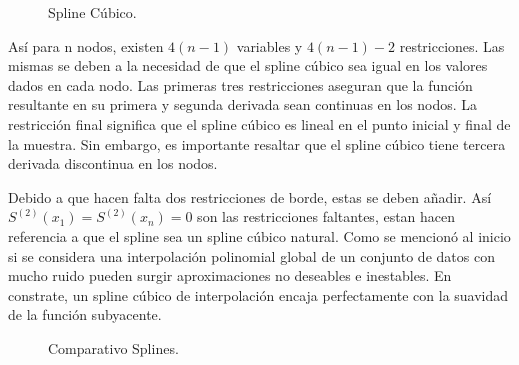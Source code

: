 \begin{figure}[h]
\caption{Spline C\'ubico.}
\label{spline_3}
\end{figure}


\hspace{0.4cm}As\'i para n nodos, existen $4(n-1)$ variables y $4(n-1)-2$ restricciones. Las mismas se deben a la necesidad de que el spline c\'ubico sea igual en los valores dados en cada nodo. Las primeras tres restricciones aseguran que la funci\'on resultante en su primera y segunda derivada sean continuas en los nodos. La restricci\'on final significa que el spline c\'ubico es lineal en el punto inicial y final de la muestra. Sin embargo, es importante resaltar que el spline c\'ubico tiene tercera derivada discontinua en los nodos.

\hspace{0.4cm}Debido a que hacen falta dos restricciones de borde, estas se deben a\~nadir. As\'i  $S^{(2)}(x_{1}) = S^{(2)}(x_{n}) = 0$ son las restricciones faltantes, estan hacen referencia a que el spline sea un spline c\'ubico natural. Como se mencion\'o al inicio si se considera una interpolaci\'on polinomial global de un conjunto de datos con mucho ruido pueden surgir aproximaciones no deseables e inestables. En constrate, un spline c\'ubico de interpolaci\'on encaja perfectamente con la suavidad de la funci\'on subyacente.

\begin{figure}[h]
\caption{Comparativo Splines.}
\end{figure}

